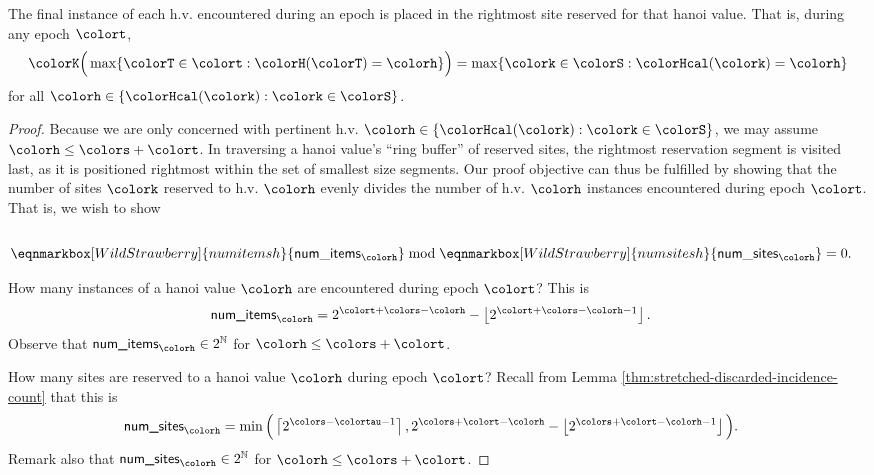 \begin{lemma}
\label{thm:tilted-last-touched}
The final instance of each h.v. encountered during an epoch is placed in the rightmost site reserved for that hanoi value.
That is, during any epoch $\colort$,
\begin{align*}
\colorK\Big(
  \max\{\colorT \in \colort : \colorH(\colorT) = \colorh\}
\Big)
=
\max\{\colork \in \colorS : \colorHcal(\colork) = \colorh \}
\end{align*}
for all $\colorh \in \{\colorHcal(\colork) : \colork \in \colorS\}$.
\end{lemma}

\begin{proof}
Because we are only concerned with pertinent h.v. $\colorh \in \{\colorHcal(\colork) : \colork \in \colorS\}$, we may assume $\colorh \leq \colors + \colort$.
In traversing a hanoi value's ``ring buffer'' of reserved sites, the rightmost reservation segment is visited last, as it is positioned rightmost within the set of smallest size segments.
Our proof objective can thus be fulfilled by showing that the number of sites $\colork$ reserved to h.v. $\colorh$ evenly divides the number of h.v. $\colorh$ instances encountered during epoch $\colort$.
That is, we wish to show
\begin{align*}
\\
\eqnmarkbox[WildStrawberry]{numitemsh}{
  \mathsf{num\_items}_{\colorh}
}
\bmod
\eqnmarkbox[WildStrawberry]{numsitesh}{
  \mathsf{num\_sites}_{\colorh}
}
&= 0.
\end{align*}


How many instances of a hanoi value $\colorh$ are encountered during epoch $\colort$?
This is
\begin{align*}
\textsf{num\_items}_{\colorh}
&=
2^{\colort + \colors - \colorh} - \left\lfloor2^{\colort + \colors - \colorh - 1} \right\rfloor.
\end{align*}
Observe that $\textsf{num\_items}_{\colorh} \in 2^{\mathbb{N}}$ for $\colorh \leq \colors + \colort$.

How many sites are reserved to a hanoi value $\colorh$ during epoch $\colort$?
Recall from Lemma \ref{thm:stretched-discarded-incidence-count} that this is
\begin{align*}
\textsf{num\_sites}_{\colorh}
&=
\min\Big(
\left\lceil 2^{\colors - \colortau - 1} \right\rceil,
2^{\colors + \colort - \colorh} - \left\lfloor 2^{\colors + \colort - \colorh - 1} \right\rfloor
\Big).
\end{align*}
Remark also that
$\textsf{num\_sites}_{\colorh} \in 2^{\mathbb{N}}$ for $\colorh \leq \colors + \colort$.


\end{proof}
